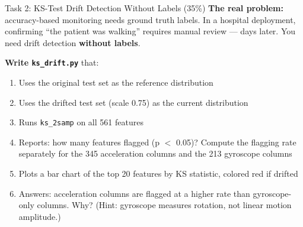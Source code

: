 \documentclass[aspectratio=169,11pt]{beamer}
\begin{document}
\begin{frame}[fragile,shrink=8]{Task 2: KS-Test Drift Detection Without Labels (35\%)}
    \textbf{The real problem:} accuracy-based monitoring needs ground truth labels. In a hospital deployment, confirming ``the patient was walking'' requires manual review --- days later. You need drift detection \textbf{without labels}.

    \vspace{0.2cm}
    \textbf{Write \texttt{ks\_drift.py}} that:
    \begin{enumerate}
        \item Uses the original test set as the reference distribution
        \item Uses the drifted test set (scale 0.75) as the current distribution
        \item Runs \texttt{ks\_2samp} on all 561 features
        \item Reports: how many features flagged (p $<$ 0.05)? Compute the flagging rate separately for the 345 acceleration columns and the 213 gyroscope columns
        \item Plots a bar chart of the top 20 features by KS statistic, colored red if drifted
        \item Answers: acceleration columns are flagged at a higher rate than gyroscope-only columns. Why? (Hint: gyroscope measures rotation, not linear motion amplitude.)
    \end{enumerate}

\end{frame}
\end{document}
